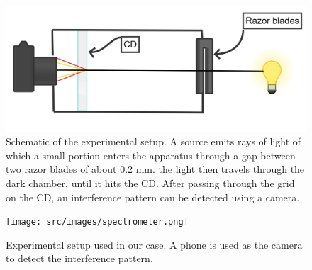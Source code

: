     \begin{minipage}{0.99\linewidth}
        \begin{minipage}{0.45\linewidth}
            \begin{figure}[H]
                \centering
                \includegraphics[scale = 0.4]{src/images/experimental_setup.png}
                \caption{Schematic of the experimental setup.
                A source emits rays of light of which a small portion enters the apparatus through a gap between two razor blades of about 0.2 mm.
                the light then travels through the dark chamber, until it hits the CD.
                After passing through the grid on the CD, an interference pattern can be detected using a camera.}
                \label{fig_setup}
            \end{figure}
        \end{minipage}
        \begin{minipage}{0.1\linewidth}
        \end{minipage}
        \begin{minipage}{0.45\linewidth}
          \begin{scriptsize}
            \begin{center}
                \begin{figure}[H]
                    \centering
                    \texttt{[image: src/images/spectrometer.png]}
                    \caption{Experimental setup used in our case.
                    A phone is used as the camera to detect the interference pattern.}
                    \label{fig_spectrometer}
                \end{figure}
            \end{center}
            \end{scriptsize}
        \end{minipage}
      \end{minipage}
    


